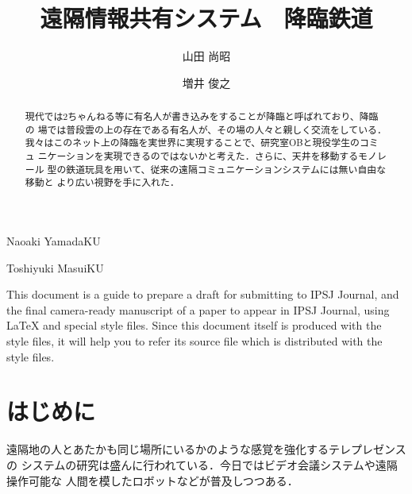 \documentclass[submit,techreq]{ipsj}
\begin{document}
\title{遠隔情報共有システム　降臨鉄道\\
}



\author{山田 尚昭}{Naoaki Yamada}{KU}
\author{増井 俊之}{Toshiyuki Masui}{KU}

\begin{abstract}
現代では2ちゃんねる等に有名人が書き込みをすることが降臨と呼ばれており、降臨の
場では普段雲の上の存在である有名人が、その場の人々と親しく交流をしている．
我々はこのネット上の降臨を実世界に実現することで、研究室OBと現役学生のコミュ
ニケーションを実現できるのではないかと考えた．さらに、天井を移動するモノレール
型の鉄道玩具を用いて、従来の遠隔コミュニケーションシステムには無い自由な移動と
より広い視野を手に入れた．
\end{abstract}


%
\begin{eabstract}
This document is a guide to prepare a draft for submitting to IPSJ
Journal, and the final camera-ready manuscript of a paper to appear in
IPSJ Journal, using {\LaTeX} and special style files.  Since this
document itself is produced with the style files, it will help you to
refer its source file which is distributed with the style files.
\end{eabstract}
%

\maketitle

\section{はじめに}

遠隔地の人とあたかも同じ場所にいるかのような感覚を強化するテレプレゼンスの
システムの研究は盛んに行われている．今日ではビデオ会議システムや遠隔操作可能な
人間を模したロボットなどが普及しつつある．
\end{document}
